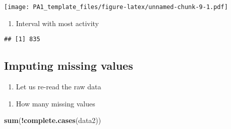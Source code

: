 \documentclass[]{article}
\newenvironment{Shaded}{\begin{snugshade}}{\end{snugshade}}
\newcommand{\KeywordTok}[1]{\textcolor[rgb]{0.13,0.29,0.53}{\textbf{#1}}}
\newcommand{\DataTypeTok}[1]{\textcolor[rgb]{0.13,0.29,0.53}{#1}}
\newcommand{\StringTok}[1]{\textcolor[rgb]{0.31,0.60,0.02}{#1}}
\newcommand{\OperatorTok}[1]{\textcolor[rgb]{0.81,0.36,0.00}{\textbf{#1}}}
\newcommand{\NormalTok}[1]{#1}
\providecommand{\tightlist}{%
  \setlength{\itemsep}{0pt}\setlength{\parskip}{0pt}}
\begin{document}
\texttt{[image: PA1\_template\_files/figure-latex/unnamed-chunk-9-1.pdf]}

\begin{enumerate}
\def\labelenumi{\arabic{enumi}.}
\setcounter{enumi}{8}
\tightlist
\item
  Interval with most activity
\end{enumerate}

\begin{Shaded}
\end{Shaded}

\begin{verbatim}
## [1] 835
\end{verbatim}

\subsection{Imputing missing values}\label{imputing-missing-values}

\begin{enumerate}
\def\labelenumi{\arabic{enumi}.}
\setcounter{enumi}{9}
\tightlist
\item
  Let us re-read the raw data
\end{enumerate}

\begin{Shaded}
\end{Shaded}

\begin{enumerate}
\def\labelenumi{\arabic{enumi}.}
\setcounter{enumi}{10}
\tightlist
\item
  How many missing values
\end{enumerate}

\begin{Shaded}
\begin{Highlighting}[]
\KeywordTok{sum}\NormalTok{(}\OperatorTok{!}\KeywordTok{complete.cases}\NormalTok{(data2))}
\end{Highlighting}
\end{Shaded}
\end{document}
